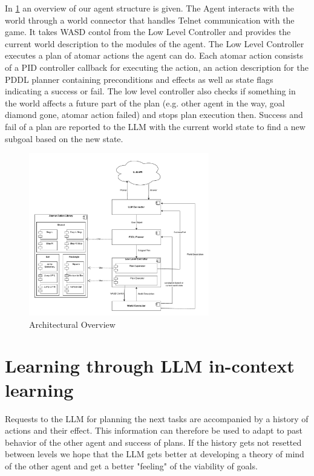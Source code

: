 \documentclass{article}
\begin{document}
In \ref{fig:architecture} an overview of our agent structure is given. The Agent interacts with the world through a world connector that handles Telnet communication with the game. It takes WASD contol from the Low Level Controller and provides the current world description to the modules of the agent. The Low Level Controller executes a plan of atomar actions the agent can do. Each atomar action consists of a PID controller callback for executing the action, an action description for the PDDL planner containing preconditions and effects as well as state flags indicating a success or fail. The low level controller also checks if something in the world affects a future part of the plan (e.g. other agent in the way, goal diamond gone, atomar action failed) and stops plan execution then. Success and fail of a plan are reported to the LLM with the current world state to find a new subgoal based on the new state.
\begin{figure}[h]
\caption{Architectural Overview}
\label{fig:architecture}
\centering
\includegraphics[width=0.7\textwidth]{graphic/IA_llm_agent.pdf}
\end{figure}

\section{Learning through LLM in-context learning}

Requests to the LLM for planning the next tasks are accompanied by a history of actions and their effect. This information can therefore be used to adapt to past behavior of the other agent and success of plans. If the history gets not resetted between levels we hope that the LLM gets better at developing a theory of mind of the other agent and get a better "feeling" of the viability of goals.
\end{document}
